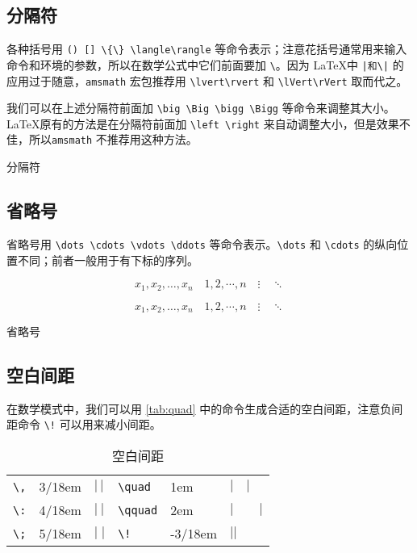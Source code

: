\subsection{分隔符}

各种括号用 \verb|() [] \{\} \langle\rangle| 等命令表示；注意花括号通常用来输入命令和环境的参数，所以在数学公式中它们前面要加 \verb|\|。因为 \LaTeX 中 \verb+|和\|+ 的应用过于随意，\texttt{amsmath} 宏包推荐用 \verb|\lvert\rvert| 和 \verb|\lVert\rVert| 取而代之。

我们可以在上述分隔符前面加 \verb|\big \Big \bigg \Bigg| 等命令来调整其大小。\LaTeX 原有的方法是在分隔符前面加 \verb|\left \right| 来自动调整大小，但是效果不佳，所以\texttt{amsmath} 不推荐用这种方法。

\begin{example}[h]
\caption{分隔符}
\label{exa:delimiters}
\end{example}

\subsection{省略号}

省略号用 \verb|\dots \cdots \vdots \ddots| 等命令表示。\verb|\dots| 和 \verb|\cdots| 的纵向位置不同；前者一般用于有下标的序列。

\begin{Code}[]
\[ x_1,x_2,\dots,x_n\quad 1,2,\cdots,n\quad 
    \vdots\quad \ddots \]
\end{Code}

\begin{example}[h]
\begin{Demo}
\[ x_1,x_2,\dots,x_n\quad 1,2,\cdots,n\quad 
    \vdots\quad \ddots \]
\end{Demo}
\caption{省略号}
\label{exa:dots}
\end{example}

\subsection{空白间距}

在数学模式中，我们可以用 \autoref{tab:quad} 中的命令生成合适的空白间距，注意负间距命令 \verb|\!| 可以用来减小间距。

\begin{table}[htbp]
\caption{空白间距}
\label{tab:quad}
\centering
\begin{tabular}{llllll}
    \toprule
    \verb|\,| & 3/18em & $|\,|$ & 
        \verb|\quad| & 1em & $|\quad|$ \\
    \verb|\:| & 4/18em & $|\:|$ & 
        \verb|\qquad| & 2em & $|\qquad|$ \\
    \verb|\;| & 5/18em & $|\;|$ & 
        \verb|\!| & -3/18em & $|\!|$ \\
    \bottomrule
\end{tabular}
\end{table}

